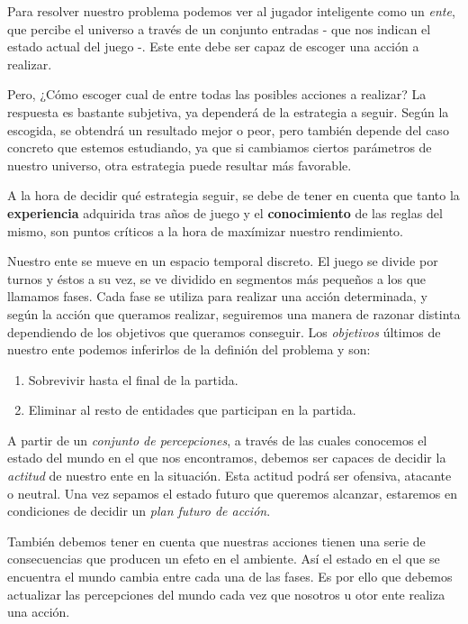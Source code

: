 \documentclass[a4paper,12pt,oneside]{book}
\begin{document}
Para resolver nuestro problema podemos ver al jugador inteligente como
un {\it ente}, que percibe el universo a través de un conjunto
entradas - que nos indican el estado actual del juego -. Este ente
debe ser capaz de escoger una acción a realizar.

Pero, ¿Cómo escoger cual de entre todas las posibles acciones a
realizar? La respuesta es bastante subjetiva, ya dependerá de la
estrategia a seguir. Según la escogida, se obtendrá un resultado mejor
o peor, pero también depende del caso concreto que estemos estudiando,
ya que si cambiamos ciertos parámetros de nuestro universo, otra
estrategia puede resultar más favorable.

A la hora de decidir qué estrategia seguir, se debe de tener en
cuenta que tanto la {\bf experiencia} adquirida tras años de juego y
el {\bf conocimiento} de las reglas del mismo, son puntos críticos a
la hora de maxímizar nuestro rendimiento.

Nuestro ente se mueve en un espacio temporal discreto. El juego se
divide por turnos y éstos a su vez, se ve dividido en segmentos más
pequeños a los que llamamos fases. Cada fase se utiliza para
realizar una acción determinada, y según la acción que queramos
realizar, seguiremos una manera de razonar distinta dependiendo de los
objetivos que queramos conseguir. Los {\it objetivos} últimos de nuestro
ente podemos inferirlos de la definión del problema y son:
\begin{enumerate}
\item Sobrevivir hasta el final de la partida.
\item Eliminar al resto de entidades que participan en la partida.\\
\end{enumerate}

A partir de un {\it conjunto de percepciones}, a través de las cuales
conocemos el estado del mundo en el que nos encontramos, debemos ser
capaces de decidir la {\it actitud } de nuestro ente en la
situación. Esta actitud podrá ser ofensiva, atacante o neutral. Una
vez sepamos el estado futuro que queremos alcanzar, estaremos en
condiciones de decidir un {\it plan futuro de acción}.

También debemos tener en cuenta que nuestras acciones tienen una serie
de consecuencias que producen un efeto en el ambiente. Así el estado
en el que se encuentra el mundo cambia entre cada una de las fases. Es
por ello que debemos actualizar las percepciones del mundo cada vez
que nosotros u otor ente realiza una acción.
\end{document}
